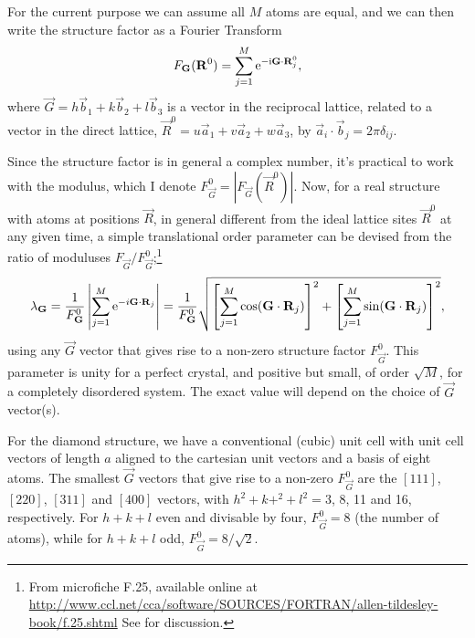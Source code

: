 \documentclass[11pt,bibliography=totoc,index=totoc]{scrbook}   %
\begin{document}
For the current purpose we can assume all $M$ atoms are equal, 
and we can then write the structure factor as\cite[241]{Martin:2004} a Fourier Transform
\begin{equation}
    F_{\boldsymbol{\mathrm{G}}}(\boldsymbol{\mathrm{R}}^0) = \sum_{j=1}^M \mathrm{e}^{-\mathrm{i}\boldsymbol{\mathrm{G}}\cdot\boldsymbol{\mathrm{R}}_j^0},
    \label{eq:structurefactor}
\end{equation}
where $\vec{G}=h\vec{b}_1 + k\vec{b}_2 + l\vec{b}_3$ is a vector in the reciprocal lattice, related to a 
vector in the direct lattice, $\vec{R}^{0} = u\vec{a}_1 + v\vec{a}_2 + w\vec{a}_3$, by $\vec{a}_i\cdot\vec{b}_j = 2\pi \delta_{ij}$.

Since the structure factor is in general a complex number, it's practical to work with the modulus, which I denote $F_{\vec{G}}^0 = |F_{\vec{G}}(\vec{R}^0)|$.
Now, for a real structure with atoms at positions $\vec{R}$, in general different from the ideal lattice sites $\vec{R}^0$ at any given time, 
a simple translational order parameter can be devised from the ratio of moduluses $F_{\vec{G}} / F_{\vec{G}}^0$;\footnote{From microfiche F.25, available online at
    \url{http://www.ccl.net/cca/software/SOURCES/FORTRAN/allen-tildesley-book/f.25.shtml} 
    See \cite[171]{Allen:1987} for discussion.}
\begin{equation}
    \lambda_{\boldsymbol{\mathrm{G}}} = \frac{1}{F_{\boldsymbol{\mathrm{G}}}^0}\left|\sum_{j=1}^M\mathrm{e}^{-i\boldsymbol{\mathrm{G}}\cdot\boldsymbol{\mathrm{R}}_j}\right| 
    = \frac{1}{F_{\boldsymbol{\mathrm{G}}}^0}\sqrt{\left[\sum_{j=1}^M\cos(\boldsymbol{\mathrm{G}}\cdot\boldsymbol{\mathrm{R}}_j)\right]^2 + \left[\sum_{j=1}^M\sin(\boldsymbol{\mathrm{G}}\cdot\boldsymbol{\mathrm{R}}_j)\right]^2},
  \label{eq:lattice_order_parameter}
\end{equation}
using any $\vec{G}$ vector that gives rise to a non-zero structure factor $F_{\vec{G}}^0$.
This parameter is unity for a perfect crystal, and positive but small, of order $\sqrt{M}$, for a completely disordered system. 
The exact value will depend on the choice of $\vec{G}$ vector(s).

For the diamond structure, we have a conventional (cubic) unit cell with unit cell vectors of length $a$ aligned to the cartesian unit vectors 
and a basis of eight atoms.
The smallest $\vec{G}$ vectors that give rise to a non-zero $F_{\vec{G}}^0$ are the $[111]$, $[220]$, $[311]$ and $[400]$ vectors, with 
$h^2+k+^2+l^2=3$, 8, 11 and 16, respectively. 
For $h+k+l$ even and divisable by four, $F_{\vec{G}}^0 = 8$ (the number of atoms), while for $h+k+l$ odd, $F_{\vec{G}}^0=8/\sqrt{2}$.

\end{document}
